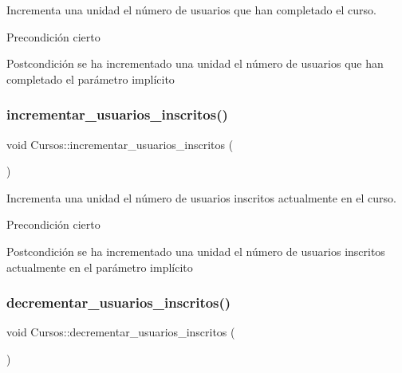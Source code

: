 Incrementa una unidad el número de usuarios que han completado el curso. 

\begin{DoxyPrecond}{Precondición}
cierto 
\end{DoxyPrecond}
\begin{DoxyPostcond}{Postcondición}
se ha incrementado una unidad el número de usuarios que han completado el parámetro implícito 
\end{DoxyPostcond}
\mbox{\label{class_cursos_a8e05dcf1247f0123619b711a68ca4a66}} 
\subsubsection{\texorpdfstring{incrementar\+\_\+usuarios\+\_\+inscritos()}{incrementar\_usuarios\_inscritos()}}
{\footnotesize\ttfamily void Cursos\+::incrementar\+\_\+usuarios\+\_\+inscritos (\begin{DoxyParamCaption}{ }\end{DoxyParamCaption})}



Incrementa una unidad el número de usuarios inscritos actualmente en el curso. 

\begin{DoxyPrecond}{Precondición}
cierto 
\end{DoxyPrecond}
\begin{DoxyPostcond}{Postcondición}
se ha incrementado una unidad el número de usuarios inscritos actualmente en el parámetro implícito 
\end{DoxyPostcond}
\mbox{\label{class_cursos_aa9b43f3b9380052878414fa4906b7925}} 
\subsubsection{\texorpdfstring{decrementar\+\_\+usuarios\+\_\+inscritos()}{decrementar\_usuarios\_inscritos()}}
{\footnotesize\ttfamily void Cursos\+::decrementar\+\_\+usuarios\+\_\+inscritos (\begin{DoxyParamCaption}{ }\end{DoxyParamCaption})}



